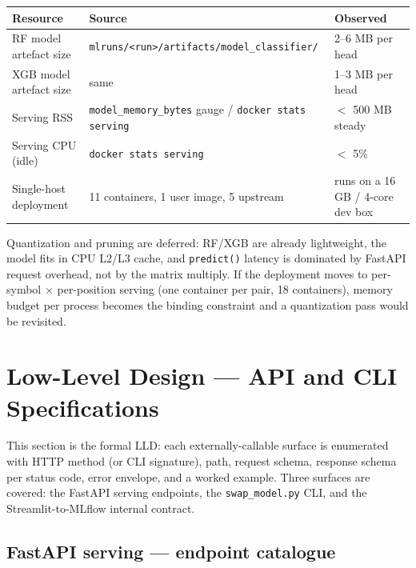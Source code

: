 \documentclass[11pt,a4paper]{article}
\begin{document}
\begin{tabularx}{\linewidth}{@{}lXl@{}}
\toprule
\textbf{Resource} & \textbf{Source} & \textbf{Observed} \\
\midrule
RF model artefact size      & \texttt{mlruns/<run>/artifacts/model\_classifier/}                       & 2--6 MB per head \\
XGB model artefact size     & same                                                                     & 1--3 MB per head \\
Serving RSS                 & \texttt{model\_memory\_bytes} gauge / \texttt{docker stats serving}       & $<$ 500 MB steady \\
Serving CPU (idle)          & \texttt{docker stats serving}                                            & $<$ 5\% \\
Single-host deployment      & 11 containers, 1 user image, 5 upstream                                  & runs on a 16 GB / 4-core dev box \\
\bottomrule
\end{tabularx}

Quantization and pruning are deferred: RF/XGB are already lightweight, the model fits in CPU L2/L3 cache, and \texttt{predict()} latency is dominated by FastAPI request overhead, not by the matrix multiply. If the deployment moves to per-symbol $\times$ per-position serving (one container per pair, 18 containers), memory budget per process becomes the binding constraint and a quantization pass would be revisited.

\newpage
\section{Low-Level Design --- API and CLI Specifications}\label{sec:lld}

This section is the formal LLD: each externally-callable surface is enumerated with HTTP method (or CLI signature), path, request schema, response schema per status code, error envelope, and a worked example. Three surfaces are covered: the FastAPI serving endpoints, the \texttt{swap\_model.py} CLI, and the Streamlit-to-MLflow internal contract.

\subsection{FastAPI serving --- endpoint catalogue}
\end{document}
